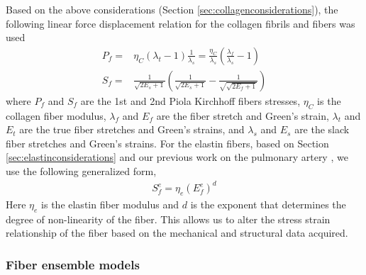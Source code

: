     Based on the above considerations (Section \ref{sec:collagenconsiderations}), the following linear force displacement relation for the collagen fibrils and fibers was used
        \begin{equation}\label{eqn:collagenfiberlaw}
        \begin{aligned}
        P_f =& \eta_{C}\left(\lambda_t - 1\right)\frac{1}{\lambda_s} = \frac{\eta_C}{\lambda_s}\left(\frac{\lambda_f}{\lambda_s} - 1\right)    \\
        S_f =& \frac{1}{\sqrt{2E_s + 1}}\left( \frac{1}{\sqrt{2 E_s + 1}} - \frac{1}{\sqrt{\sqrt{2E_f + 1}}}\right)
        \end{aligned}
        \end{equation}
    where $P_f$ and $S_f$ are the 1st and 2nd Piola Kirchhoff fibers stresses, $\eta_C$ is the collagen fiber modulus, $\lambda_f$ and $E_f$ are the fiber stretch and Green’s strain, $\lambda_t$ and $E_t$ are the true fiber stretches and Green’s strains, and $\lambda_s$ and $E_s$ are the slack fiber stretches and Green’s strains. For the elastin fibers, based on Section \ref{sec:elastinconsiderations} and our previous work on the pulmonary artery \cite{fata_insights_2014}, we use the following generalized form,
        \begin{equation}\label{eqn:elastinfiberlaw}
        \begin{aligned}
        S^e_f = \eta_e \left( E^e_f\right)^d
        \end{aligned}
        \end{equation}
    Here $\eta_e$ is the elastin fiber modulus and $d$ is the exponent that determines the degree of non-linearity of the fiber. This allows us to alter the stress strain relationship of the fiber based on the mechanical and structural data acquired.




\subsubsection{Fiber ensemble models}

